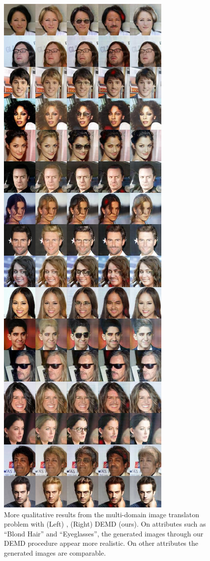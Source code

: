 \begin{figure}
    \includegraphics[height=0.85\textheight]{6_demd/figs/mwgan_res/demd-00003-images.jpg}
    \caption[Additional qualitative translation results 2]{More qualitative results from the multi-domain image translaton problem with (Left) \cite{cao2019multi}, (Right) DEMD (ours). On attributes such as ``Blond Hair'' and ``Eyeglasses'', the generated images through our DEMD procedure appear more realistic. On other attributes the generated images are comparable. }
    \label{fig:moreganres2}
\end{figure}